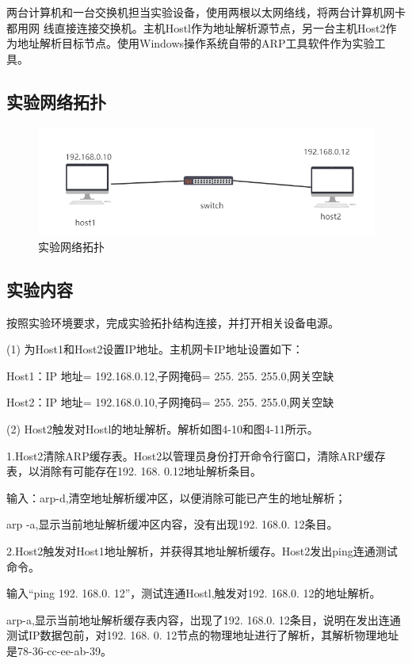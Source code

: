 \documentclass[lang=cn,11pt,a4paper,cite=authoryear]{elegantpaper}
\begin{document}
两台计算机和一台交换机担当实验设备，使用两根以太网络线，将两台计算机网卡都用网 线直接连接交换机。主机Hostl作为地址解析源节点，另一台主机Host2作为地址解析目标节点。使用Windows操作系统自带的ARP工具软件作为实验工具。

\subsection{实验网络拓扑}
\begin{figure}[htbp]
	\centering
	\includegraphics[width=0.7\linewidth]{image/screenshot011}
	\caption{实验网络拓扑}
	\label{fig:screenshot011}
\end{figure}


\subsection{实验内容}

按照实验环境要求，完成实验拓扑结构连接，并打开相关设备电源。

(1)	为Host1和Host2设置IP地址。主机网卡IP地址设置如下：

Host1：IP 地址= 192.168.0.12,子网掩码= 255. 255. 255.0,网关空缺

Host2：IP 地址= 192.168.0.10,子网掩码= 255. 255. 255.0,网关空缺

(2)	Host2触发对Hostl的地址解析。解析如图4-10和图4-11所示。

1.Host2清除ARP缓存表。Host2以管理员身份打开命令行窗口，清除ARP缓存表，以消除有可能存在192. 168. 0.12地址解析条目。

输入：arp-d,清空地址解析缓冲区，以便消除可能已产生的地址解析；

arp -a,显示当前地址解析缓冲区内容，没有出现192. 168.0. 12条目。

2.Host2触发对Host1地址解析，并获得其地址解析缓存。Host2发出ping连通测试命令。

输入“ping 192. 168.0. 12”，测试连通Hostl,触发对192. 168.0. 12的地址解析。

arp-a,显示当前地址解析缓存表内容，岀现了192. 168.0. 12条目，说明在发出连通测试IP数据包前，对192. 168. 0. 12节点的物理地址进行了解析，其解析物理地址是78-36-cc-ee-ab-39。
\end{document}
